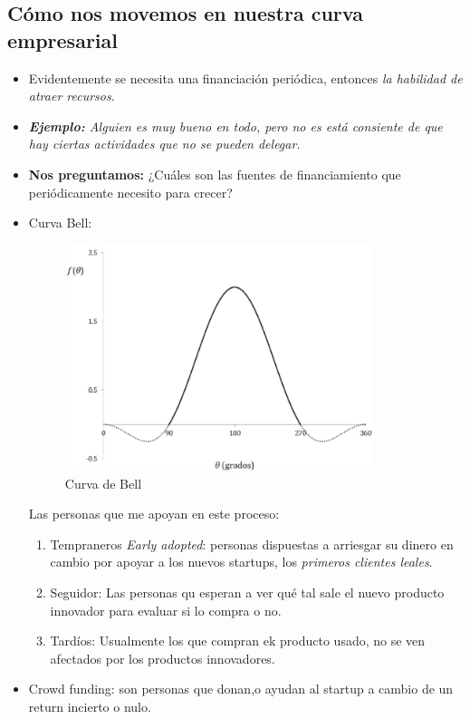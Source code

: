 \subsection{Cómo nos movemos en nuestra curva empresarial}
\begin{itemize}
    \item Evidentemente se necesita una financiación periódica, entonces \emph{la habilidad de atraer recursos}.
    \item \emph{\textbf{Ejemplo: }Alguien es muy bueno en todo, pero no es está consiente de que hay ciertas actividades que no se pueden delegar.}
    \item \textbf{Nos preguntamos:} ¿Cuáles son las fuentes de financiamiento que periódicamente necesito para crecer?
    \item Curva Bell:
        \begin{figure}[htbp]
            \centering
            \includegraphics[width=9cm]{./../__Imagenes__/2020-02-05-Global-01.png}
            \caption{Curva de Bell}
            \label{}
        \end{figure}
        Las personas que me apoyan en este proceso: 
        \begin{enumerate}
            \item Tempraneros \emph{Early adopted}: personas dispuestas a arriesgar su dinero en cambio por apoyar a los nuevos startups, los \emph{primeros clientes leales}. 
            \item Seguidor: Las personas qu esperan a ver qué tal sale el nuevo producto innovador para evaluar si lo compra o no.
            \item Tardíos: Usualmente los que compran ek producto usado, no se ven afectados por los productos innovadores. 
        \end{enumerate}
    
    \item Crowd funding: son personas que donan,o ayudan al startup a cambio de un return incierto o nulo.
\end{itemize}


